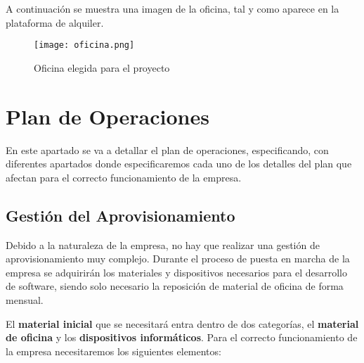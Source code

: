 A continuación se muestra una imagen de la oficina, tal y como aparece en la plataforma de alquiler.

\begin{figure}[H]
    \centering
    \texttt{[image: oficina.png]}
    \caption{Oficina elegida para el proyecto}
\end{figure}

\section{Plan de Operaciones}
En este apartado se va a detallar el plan de operaciones, especificando, con diferentes apartados donde especificaremos cada uno de los detalles del plan que afectan para el correcto funcionamiento de la empresa.

\subsection{Gestión del Aprovisionamiento}
Debido a la naturaleza de la empresa, no hay que realizar una gestión de aprovisionamiento muy complejo. Durante el proceso de puesta en marcha de la empresa se adquirirán los materiales y dispositivos necesarios para el desarrollo de software, siendo solo necesario la reposición de material de oficina de forma mensual.

El \textbf{material inicial} que se necesitará entra dentro de dos categorías, el \textbf{material de oficina} y los \textbf{dispositivos informáticos}. Para el correcto funcionamiento de la empresa necesitaremos los siguientes elementos:

